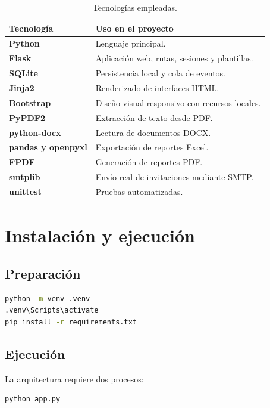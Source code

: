\documentclass[12pt,a4paper]{article}
\begin{document}
\begin{table}[ht]
\centering
\begin{tabularx}{\textwidth}{>{\bfseries}p{3.6cm}X}
\toprule
Tecnología & Uso en el proyecto \\
\midrule
Python & Lenguaje principal. \\
Flask & Aplicación web, rutas, sesiones y plantillas. \\
SQLite & Persistencia local y cola de eventos. \\
Jinja2 & Renderizado de interfaces HTML. \\
Bootstrap & Diseño visual responsivo con recursos locales. \\
PyPDF2 & Extracción de texto desde PDF. \\
python-docx & Lectura de documentos DOCX. \\
pandas y openpyxl & Exportación de reportes Excel. \\
FPDF & Generación de reportes PDF. \\
smtplib & Envío real de invitaciones mediante SMTP. \\
unittest & Pruebas automatizadas. \\
\bottomrule
\end{tabularx}
\caption{Tecnologías empleadas.}
\end{table}

\section{Instalación y ejecución}

\subsection{Preparación}

\begin{lstlisting}[language=bash,caption={Instalación del entorno.}]
python -m venv .venv
.venv\Scripts\activate
pip install -r requirements.txt
\end{lstlisting}

\subsection{Ejecución}

La arquitectura requiere dos procesos:

\begin{lstlisting}[language=bash,caption={Terminal 1: aplicación web.}]
python app.py
\end{lstlisting}
\end{document}
